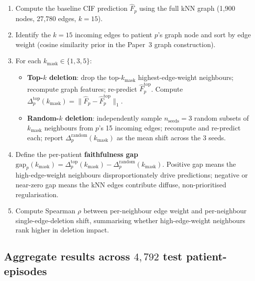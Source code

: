 \documentclass[11pt]{article}
\begin{document}
\begin{enumerate}\itemsep=0.3em
  \item Compute the baseline CIF prediction $\widehat{F}_p$ using the full kNN graph (1{,}900 nodes, 27{,}780 edges, $k{=}15$).
  \item Identify the $k{=}15$ incoming edges to patient $p$'s graph node and sort by edge weight (cosine similarity prior in the Paper~3 graph construction).
  \item For each $k_\mathrm{mask} \in \{1, 3, 5\}$:
  \begin{itemize}\itemsep=0.15em
    \item \textbf{Top-$k$ deletion}: drop the top-$k_\mathrm{mask}$ highest-edge-weight neighbours; recompute graph features; re-predict $\widehat{F}_p^\mathrm{top}$. Compute $\Delta_p^\mathrm{top}(k_\mathrm{mask}) = \|\widehat{F}_p - \widehat{F}_p^\mathrm{top}\|_1$.
    \item \textbf{Random-$k$ deletion}: independently sample $n_\mathrm{seeds}{=}3$ random subsets of $k_\mathrm{mask}$ neighbours from $p$'s 15 incoming edges; recompute and re-predict each; report $\Delta_p^\mathrm{random}(k_\mathrm{mask})$ as the mean shift across the 3 seeds.
  \end{itemize}
  \item Define the per-patient \textbf{faithfulness gap} $\mathrm{gap}_p(k_\mathrm{mask}) = \Delta_p^\mathrm{top}(k_\mathrm{mask}) - \Delta_p^\mathrm{random}(k_\mathrm{mask})$. Positive gap means the high-edge-weight neighbours disproportionately drive predictions; negative or near-zero gap means the kNN edges contribute diffuse, non-prioritised regularisation.
  \item Compute Spearman $\rho$ between per-neighbour edge weight and per-neighbour single-edge-deletion shift, summarising whether high-edge-weight neighbours rank higher in deletion impact.
\end{enumerate}

\subsection*{Aggregate results across $4{,}792$ test patient-episodes}
\end{document}
